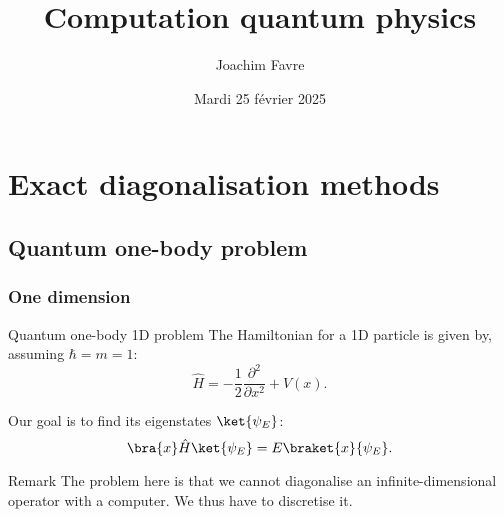 \documentclass[a4paper]{article}
\title{Computation quantum physics}
\author{Joachim Favre}
\date{Mardi 25 février 2025}
\begin{document}
\maketitle


\section{Exact diagonalisation methods}
\subsection{Quantum one-body problem}
\subsubsection{One dimension}

\begin{parag}{Quantum one-body 1D problem}
    The Hamiltonian for a 1D particle is given by, assuming $\hbar = m = 1$: 
    \[\hat{H} = -\frac{1}{2} \frac{\partial^2}{\partial x^2} + V\left(x\right).\]

    Our goal is to find its eigenstates $\ket{\psi_E}$: 
        \[\bra{x} \hat{H} \ket{\psi_E} = E \braket{x}{\psi_E}.\]

    \begin{subparag}{Remark}
        The problem here is that we cannot diagonalise an infinite-dimensional operator with a computer. We thus have to discretise it.
    \end{subparag}
\end{parag}
\end{document}
